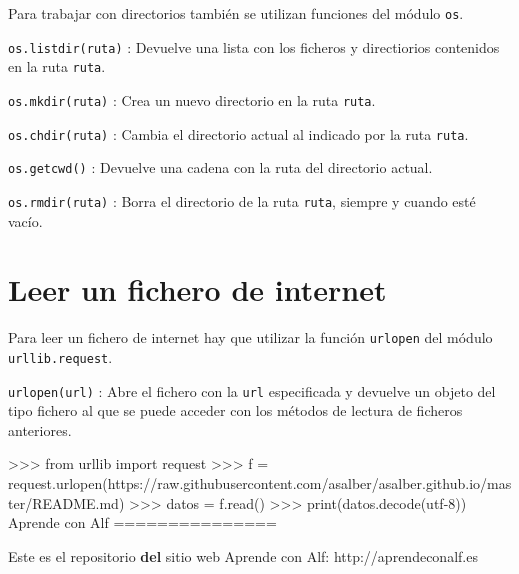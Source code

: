 \documentclass[
  spanish,
  a4paper,
]{scrreport}
\newenvironment{Shaded}{\begin{snugshade}}{\end{snugshade}}
\newcommand{\BuiltInTok}[1]{\textcolor[rgb]{0.00,0.23,0.31}{#1}}
\newcommand{\ImportTok}[1]{\textcolor[rgb]{0.00,0.46,0.62}{#1}}
\newcommand{\KeywordTok}[1]{\textcolor[rgb]{0.00,0.23,0.31}{\textbf{#1}}}
\newcommand{\NormalTok}[1]{\textcolor[rgb]{0.00,0.23,0.31}{#1}}
\newcommand{\OperatorTok}[1]{\textcolor[rgb]{0.37,0.37,0.37}{#1}}
\newcommand{\StringTok}[1]{\textcolor[rgb]{0.13,0.47,0.30}{#1}}
\begin{document}
Para trabajar con directorios también se utilizan funciones del módulo
\texttt{os}.

\texttt{os.listdir(ruta)} : Devuelve una lista con los ficheros y
directiorios contenidos en la ruta \texttt{ruta}.

\texttt{os.mkdir(ruta)} : Crea un nuevo directorio en la ruta
\texttt{ruta}.

\texttt{os.chdir(ruta)} : Cambia el directorio actual al indicado por la
ruta \texttt{ruta}.

\texttt{os.getcwd()} : Devuelve una cadena con la ruta del directorio
actual.

\texttt{os.rmdir(ruta)} : Borra el directorio de la ruta \texttt{ruta},
siempre y cuando esté vacío.

\section{Leer un fichero de internet}\label{leer-un-fichero-de-internet}

Para leer un fichero de internet hay que utilizar la función
\texttt{urlopen} del módulo \texttt{urllib.request}.

\texttt{urlopen(url)} : Abre el fichero con la \texttt{url} especificada
y devuelve un objeto del tipo fichero al que se puede acceder con los
métodos de lectura de ficheros anteriores.

\begin{Shaded}
\begin{Highlighting}[]
\OperatorTok{\textgreater{}\textgreater{}\textgreater{}} \ImportTok{from}\NormalTok{ urllib }\ImportTok{import}\NormalTok{ request}
\OperatorTok{\textgreater{}\textgreater{}\textgreater{}}\NormalTok{ f }\OperatorTok{=}\NormalTok{ request.urlopen(}\StringTok{\textquotesingle{}https://raw.githubusercontent.com/asalber/asalber.github.io/master/README.md\textquotesingle{}}\NormalTok{)}
\OperatorTok{\textgreater{}\textgreater{}\textgreater{}}\NormalTok{ datos }\OperatorTok{=}\NormalTok{ f.read()}
\OperatorTok{\textgreater{}\textgreater{}\textgreater{}} \BuiltInTok{print}\NormalTok{(datos.decode(}\StringTok{\textquotesingle{}utf{-}8\textquotesingle{}}\NormalTok{))}
\NormalTok{Aprende con Alf}
\OperatorTok{===============}

\NormalTok{Este es el repositorio }\KeywordTok{del}\NormalTok{ sitio web Aprende con Alf: http:}\OperatorTok{//}\NormalTok{aprendeconalf.es}
\end{Highlighting}
\end{Shaded}
\end{document}
